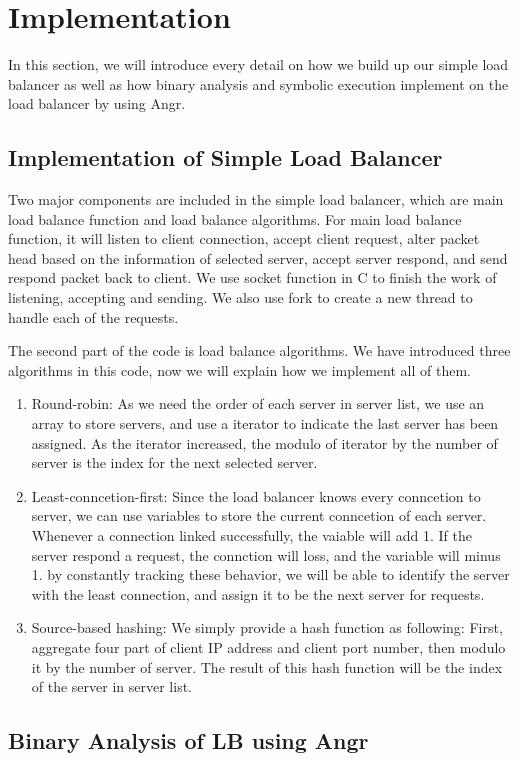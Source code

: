 \section{Implementation}

In this section, we will introduce every detail on how we build up our simple load balancer as well as how binary analysis and symbolic execution implement on the load balancer by using Angr.

\subsection{Implementation of Simple Load Balancer}
Two major components are included in the simple load balancer, which are main load balance function and load balance algorithms.
For main load balance function, it will \ca listen to client connection, \cb accept client request, \cc alter packet head based on the information of selected server, \cd accept server respond, and \ce send respond packet back to client.
We use socket function in C to finish the work of listening, accepting and sending.
We also use fork to create a new thread to handle each of the requests.

The second part of the code is load balance algorithms.
We have introduced three algorithms in this code, now we will explain how we implement all of them.
\begin{enumerate}
	\item Round-robin: As we need the order of each server in server list, we use an array to store servers, and use a iterator to indicate the last server has been assigned. As the iterator increased, the modulo of iterator by the number of server is the index for the next selected server.
	\item Least-conncetion-first: Since the load balancer knows every conncetion to server, we can use variables to store the current conncetion of each server. Whenever a connection linked successfully, the vaiable will add 1. If the server respond a request, the connction will loss, and the variable will minus 1. by constantly tracking these behavior, we will be able to identify the server with the least connection, and assign it to be the next server for requests.
	\item Source-based hashing: We simply provide a hash function as following:  First, aggregate four part of client IP address and client port number, then modulo it by the number of server. The result of this hash function will be the index of the server in server list.
\end{enumerate}

\subsection{Binary Analysis of LB using Angr}

